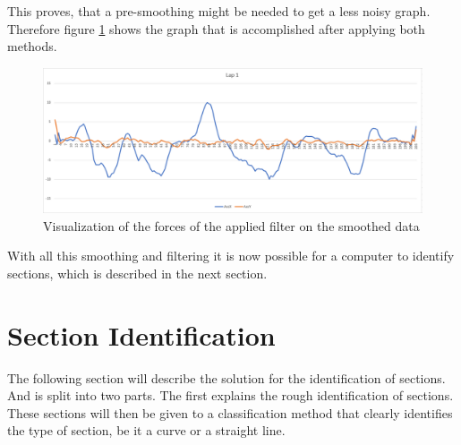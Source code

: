 This proves, that a pre-smoothing might be needed to get a less noisy graph. Therefore figure \ref{fig:sgFor} shows the graph that is accomplished after applying both methods.

\begin{figure}[H]
	\centering
	\includegraphics[scale= 0.45]{Pictures/sgForces.png}
	\caption{Visualization of the forces of the applied filter on the smoothed data}
	\label{fig:sgFor}
\end{figure}

With all this smoothing and filtering it is now possible for a computer to identify sections, which is described in the next section.

\newpage
\section{Section Identification}
The following section will describe the solution for the identification of sections. And is split into two parts. The first explains the rough identification of sections. These sections will then be given to a classification method that clearly identifies the type of section, be it a curve or a straight line. 

